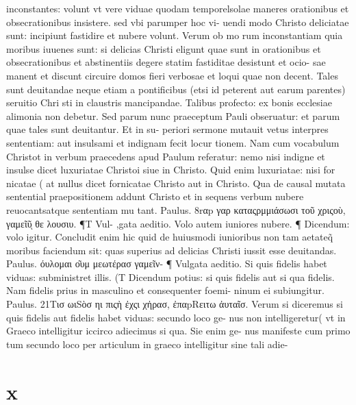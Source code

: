 \documentclass{article}
\begin{document}
\begin{pages}
inconstantes: volunt vt vere viduae quodam temporelsolae maneres orationibus et obsecrationibus insistere. sed vbi parumper hoc vi- uendi modo Christo deliciatae sunt: incipiunt fastidire et nubere volunt. Verum ob mo rum inconstantiam quia moribus iuuenes sunt: si delicias Christi eligunt quae sunt in orationibus et obsecrationibus et abstinentiis degere statim fastiditae desistunt et ocio- sae manent et discunt circuire domos fieri verbosae et loqui quae non decent. Tales sunt deuitandae neque etiam a pontificibus (etsi id peterent aut earum parentes) seruitio Chri sti in claustris mancipandae. Talibus profecto: ex bonis ecclesiae alimonia non debetur. Sed parum nunc praeceptum Pauli obseruatur: et parum quae tales sunt deuitantur. Et in su- periori sermone mutauit vetus interpres sententiam: aut insulsami et indignam fecit locur tionem. Nam cum vocabulum Christot in verbum praecedens apud Paulum referatur: nemo nisi indigne et insulse dicet luxuriatae Christoi siue in Christo. Quid enim luxuriatae: nisi for nicatae ( at nullus dicet fornicatae Christo aut in Christo. Qua de causal mutata sentential praepositionem addunt Christo et in sequens verbum nubere reuocantsatque sententiam mu tant. Paulus. 8rαp γαρ καταςρμμιάσωσι τοῦ χριςοὺ, γαμεῖῦͅ θε λουσιυ. ¶T Vul- ,gata aeditio. Volo autem iuniores nubere. ¶ Dicendum: volo igitur. Concludit enim hic quid de huiusmodi iunioribus non tam aetateq̃ moribus faciendum sit: quas superius ad delicias Christi iussit esse deuitandas. Paulus. όυλομαι ο͂υμ μεωτέρασ γαμεῖν-  ¶ Vulgata aeditio. Si quis fidelis habet viduas: subministret illis. (T Dicendum potius: si quis fidelis aut si qua fidelis. Nam fidelis prius in masculino et consequenter foemi- ninum ei subiungitur. Paulus. 21Tισ ωιSὸσ ηι πιςὴ ἐχςι χἠρασ, ἐπαpRειτω ἀυταῖσ. Verum si diceremus si quis fidelis aut fidelis habet viduas: secundo loco ge- nus non intelligeretur( vt in Graeco intelligitur iccirco adiecimus si qua. Sie enim ge- nus manifeste cum primo tum secundo loco per articulum in graeco intelligitur sine tali adie-  \pend
\section*{x }

\end{pages}
\end{document}
